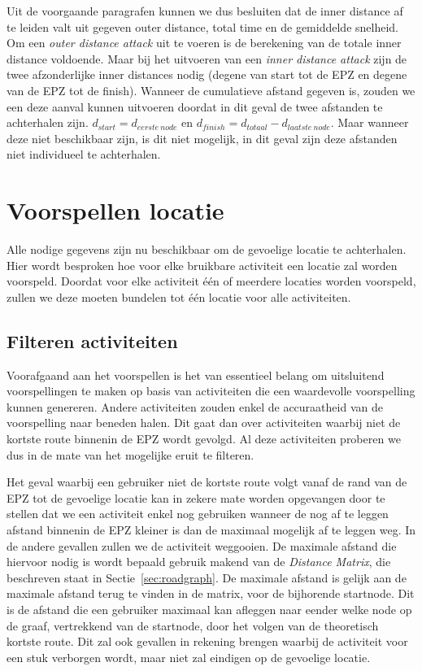 Uit de voorgaande paragrafen kunnen we dus besluiten dat de inner distance af
te leiden valt uit gegeven outer distance, total time en de gemiddelde
snelheid. Om een \textit{outer distance attack} uit te voeren is de berekening
van de totale inner distance voldoende. Maar bij het uitvoeren van een
\textit{inner distance attack} zijn de twee afzonderlijke inner distances nodig
(degene van start tot de \ac{EPZ} en degene van de \ac{EPZ} tot de finish).
Wanneer de cumulatieve afstand gegeven is, zouden we een deze aanval kunnen
uitvoeren doordat in dit geval de twee afstanden te achterhalen zijn.
$d_{start} = d_{eerste\ node}$ en $d_{finish} = d_{totaal} - d_{laatste\
            node}$. Maar wanneer deze niet beschikbaar zijn, is dit niet mogelijk, in dit
geval zijn deze afstanden niet individueel te achterhalen.

\section{Voorspellen locatie}
Alle nodige gegevens zijn nu beschikbaar om de gevoelige locatie te
achterhalen. Hier wordt besproken hoe voor elke bruikbare activiteit een
locatie zal worden voorspeld. Doordat voor elke activiteit één of meerdere
locaties worden voorspeld, zullen we deze moeten bundelen tot één locatie voor
alle activiteiten.

\subsection{Filteren activiteiten}
Voorafgaand aan het voorspellen is het van essentieel belang om uitsluitend
voorspellingen te maken op basis van activiteiten die een waardevolle
voorspelling kunnen genereren. Andere activiteiten zouden enkel de accuraatheid
van de voorspelling naar beneden halen. Dit gaat dan over activiteiten waarbij
niet de kortste route binnenin de \ac{EPZ} wordt gevolgd. Al deze activiteiten
proberen we dus in de mate van het mogelijke eruit te filteren.

Het geval waarbij een gebruiker niet de kortste route volgt vanaf de rand van
de \ac{EPZ} tot de gevoelige locatie kan in zekere mate worden opgevangen door
te stellen dat we een activiteit enkel nog gebruiken wanneer de nog af te
leggen afstand binnenin de \ac{EPZ} kleiner is dan de maximaal mogelijk af te
leggen weg. In de andere gevallen zullen we de activiteit weggooien. De
maximale afstand die hiervoor nodig is wordt bepaald gebruik makend van de
\textit{Distance Matrix}, die beschreven staat in Sectie~\ref{sec:roadgraph}.
De maximale afstand is gelijk aan de maximale afstand terug te vinden in de
matrix, voor de bijhorende startnode. Dit is de afstand die een gebruiker
maximaal kan afleggen naar eender welke node op de graaf, vertrekkend van de
startnode, door het volgen van de theoretisch kortste route. Dit zal ook
gevallen in rekening brengen waarbij de activiteit voor een stuk verborgen
wordt, maar niet zal eindigen op de gevoelige locatie.

